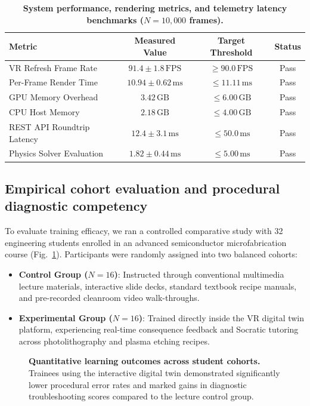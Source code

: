 \documentclass[10pt,a4paper,twocolumn]{article}
\begin{document}
\begin{table}[!t]
\centering
\caption{\textbf{System performance, rendering metrics, and telemetry latency benchmarks ($N = 10{,}000$ frames).}}
\label{table:performance_benchmarks}
\small
\begin{tabular}{lccc}
\toprule
\textbf{Metric} & \textbf{Measured Value} & \textbf{Target Threshold} & \textbf{Status} \\
\midrule
VR Refresh Frame Rate & $91.4 \pm 1.8\,\text{FPS}$ & $\ge 90.0\,\text{FPS}$ & Pass \\
Per-Frame Render Time & $10.94 \pm 0.62\,\text{ms}$ & $\le 11.11\,\text{ms}$ & Pass \\
GPU Memory Overhead & $3.42\,\text{GB}$ & $\le 6.00\,\text{GB}$ & Pass \\
CPU Host Memory & $2.18\,\text{GB}$ & $\le 4.00\,\text{GB}$ & Pass \\
REST API Roundtrip Latency & $12.4 \pm 3.1\,\text{ms}$ & $\le 50.0\,\text{ms}$ & Pass \\
Physics Solver Evaluation & $1.82 \pm 0.44\,\text{ms}$ & $\le 5.00\,\text{ms}$ & Pass \\
\bottomrule
\end{tabular}
\end{table}

\subsection*{Empirical cohort evaluation and procedural diagnostic competency}
To evaluate training efficacy, we ran a controlled comparative study with 32 engineering students enrolled in an advanced semiconductor microfabrication course (Fig.~\ref{fig:cohort_results}). Participants were randomly assigned into two balanced cohorts:
\begin{itemize}
    \item \textbf{Control Group ($N=16$)}: Instructed through conventional multimedia lecture materials, interactive slide decks, standard textbook recipe manuals, and pre-recorded cleanroom video walk-throughs.
    \item \textbf{Experimental Group ($N=16$)}: Trained directly inside the VR digital twin platform, experiencing real-time consequence feedback and Socratic tutoring across photolithography and plasma etching recipes.
\end{itemize}

\begin{figure}[!t]
\centering
{}
\caption{\textbf{Quantitative learning outcomes across student cohorts.} Trainees using the interactive digital twin demonstrated significantly lower procedural error rates and marked gains in diagnostic troubleshooting scores compared to the lecture control group.}
\label{fig:cohort_results}
\end{figure}
\end{document}
